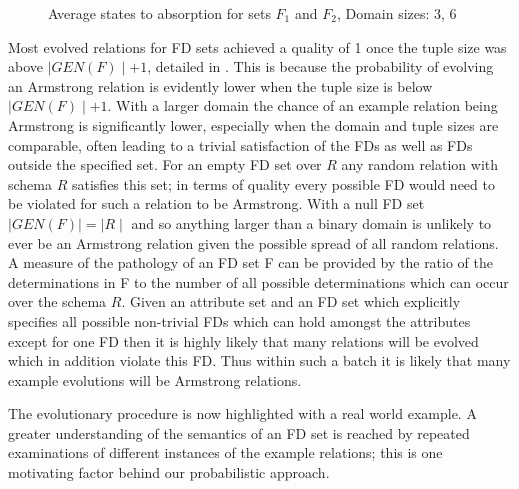 \begin{figure}
\centerline{}
\caption{\label{graph:16_82}\scriptsize{Average states to absorption for sets $F_1$ and $F_2$, Domain sizes: 3, 6 }}
\end{figure}

Most evolved relations for FD sets achieved a quality of 1 once the
tuple size was above $\mid GEN(F) \mid + 1$, detailed in \cite{cl96}.
 This is because the probability
of evolving an Armstrong relation is evidently lower when the tuple size
 is below
$\mid GEN(F) \mid + 1$. With a larger domain the chance of an example
relation being Armstrong is significantly lower, especially when the
domain and tuple sizes are comparable, often leading to a trivial
satisfaction of the FDs as well as FDs outside the specified set.
For an empty FD set over $R$ any random relation with schema $R$ satisfies this set;
in terms of quality every possible FD would need to be violated for such
a relation to be Armstrong.
 With a null FD set $\mid GEN(F) \mid = \mid R \mid$ and so
anything larger than a binary domain is unlikely to ever be an Armstrong
relation given the possible spread of all random relations. A measure
of the pathology of an FD set F can be
 provided by the ratio
of the determinations in F to the number of all possible determinations
which can occur over the schema $R$.
Given an attribute set and an FD set
which explicitly specifies all possible non-trivial FDs which
can hold amongst the attributes except for one FD then it is highly likely that
many relations will be evolved which in addition violate this FD. Thus within
such a batch it is likely that many example evolutions will be Armstrong
relations. 

\medskip

The evolutionary procedure is now highlighted with a real world 
example. A greater understanding of the semantics of 
an FD set
is reached by repeated examinations of different instances of the
example relations; this is one motivating factor behind our probabilistic approach.

